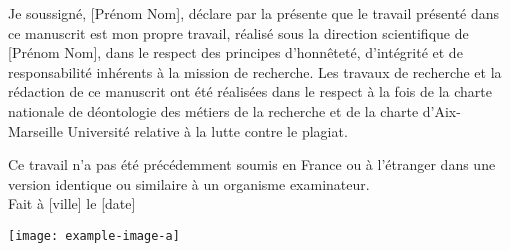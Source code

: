 \iftrue %
    Je soussigné, [Prénom Nom], %
    déclare par la présente que le travail présenté dans ce manuscrit est mon propre travail, réalisé sous la direction scientifique de [Prénom Nom], %
    dans le respect des principes d’honnêteté, d'intégrité et de responsabilité inhérents à la mission de recherche. Les travaux de recherche et la rédaction de ce manuscrit ont été réalisées dans le respect à la fois de la charte nationale de déontologie des métiers de la recherche et de la charte d’Aix-Marseille Université relative à la lutte contre le plagiat.
    
    Ce travail n'a pas été précédemment soumis en France ou à l'étranger dans une version identique ou similaire à un organisme examinateur.\\
    
    Fait à [ville] le [date]
    
    \begin{flushright}\texttt{[image: example-image-a]}\end{flushright}%
\fi

\iffalse %
    I, undersigned, [First Name Surname], %
    hereby declare that the work presented in this manuscript is my own work, carried out under the scientific direction of [First Name Surname], %
    in accordance with the principles of honesty, integrity and responsibility inherent to the research mission. The research work and the writing of this manuscript have been carried out in compliance with both the french national charter for Research Integrity and the Aix-Marseille University charter on the fight against plagiarism.
    
    This work has not been submitted previously either in this country or in aother country in the same or in a similar version to any other examination body.\\
    
    [Place] [date]
    
    \begin{flushright}\texttt{[image: example-image-b]}\texttt{[image: example-image-a]}\end{flushright} %
\fi

